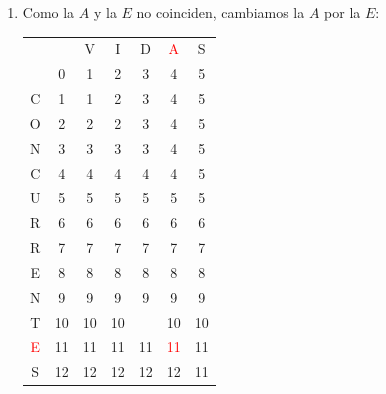 \documentclass[10pt,a4paper,spanish]{report}
\theoremstyle{definition}
\theoremstyle{remark}
\begin{document}
\begin{enumerate}
\item Como la $A$ y la $E$ no coinciden, cambiamos la $A$ por la $E$:
\begin{center}
\begin{tabular}{c|c|c|c|c|c|c|}
\multicolumn{2}{r}{} & \multicolumn{1}{c}{V} & \multicolumn{1}{c}{I} & \multicolumn{1}{c}{D} & \multicolumn{1}{c}{\textcolor{Red}{A}} & \multicolumn{1}{c}{S} \\ 
\cline{2-7} 
& $0$ & 1 & 2 & 3 & 4 & 5 \\
\cline{2-7} 
C & 1 & 1 & 2 & 3 & 4 & 5 \\
\cline{2-7}
O & 2 & 2 & 2 & 3 & 4 & 5 \\
\cline{2-7} 
N & 3 & 3 & 3 & 3 & 4 & 5 \\
\cline{2-7} 
C & 4 & 4 & 4 & 4 & 4 & 5 \\
\cline{2-7} 
U & 5 & 5 & 5 & 5 & 5 & 5 \\
\cline{2-7} 
R & 6 & 6 & 6 & 6 & 6 & 6 \\
\cline{2-7} 
R & 7 & 7 & 7 & 7 & 7 & 7 \\
\cline{2-7} 
E & 8 & 8 & 8 & 8 & 8 & 8 \\
\cline{2-7} 
N & 9 & 9 & 9 & 9 & 9 & 9 \\
\cline{2-7} 
T & 10 & 10 & 10 & \cellcolor{Cyan}{10} & 10 & 10 \\
\cline{2-7} 
\textcolor{Red}{E} & 11 & 11 & 11 & 11 & \textcolor{Red}{11} & 11 \\
\cline{2-7} 
S & 12 & 12 & 12 & 12 & 12 & \cellcolor{Green}11 \\
\cline{2-7}
\end{tabular}
\end{center}


\end{enumerate}
\end{document}
